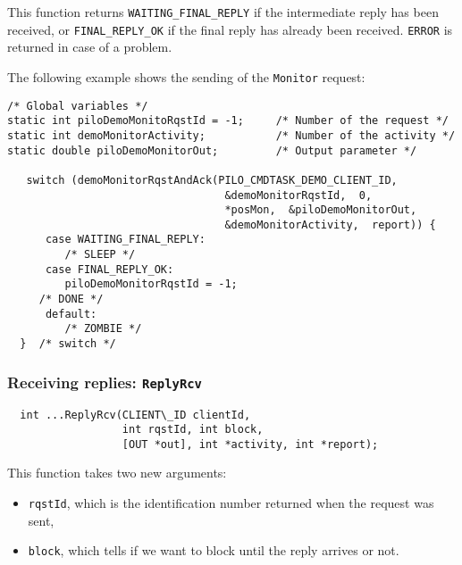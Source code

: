 This function returns {\tt   WAITING\_FINAL\_REPLY} if the   intermediate
reply has been received, or {\tt FINAL\_REPLY\_OK} if the final reply has
already been received. {\tt ERROR} is returned in case of a problem.

\bigbreak

The following example shows the sending of the {\tt Monitor} request:

\begin{center}\begin{cartouche}\small\begin{verbatim}
/* Global variables */
static int piloDemoMonitoRqstId = -1;     /* Number of the request */
static int demoMonitorActivity;           /* Number of the activity */
static double piloDemoMonitorOut;         /* Output parameter */

   switch (demoMonitorRqstAndAck(PILO_CMDTASK_DEMO_CLIENT_ID, 
                                  &demoMonitorRqstId,  0,
                                  *posMon,  &piloDemoMonitorOut, 
                                  &demoMonitorActivity,  report)) {
      case WAITING_FINAL_REPLY:
         /* SLEEP */
      case FINAL_REPLY_OK:
         piloDemoMonitorRqstId = -1;
	 /* DONE */
      default:
         /* ZOMBIE */
  }  /* switch */
\end{verbatim}\end{cartouche}\end{center}


\subsubsection{Receiving replies: {\tt ReplyRcv}}

\begin{center}\begin{cartouche}\small\begin{verbatim}
  int ...ReplyRcv(CLIENT\_ID clientId,
                  int rqstId, int block,
                  [OUT *out], int *activity, int *report);
\end{verbatim}\end{cartouche}\end{center}

This function takes two new arguments:
\begin{itemize}
\item {\tt rqstId}, which is the identification number returned when the
request was sent,

\item {\tt block}, which tells if we want to block until the
reply arrives or not.
\end{itemize}

